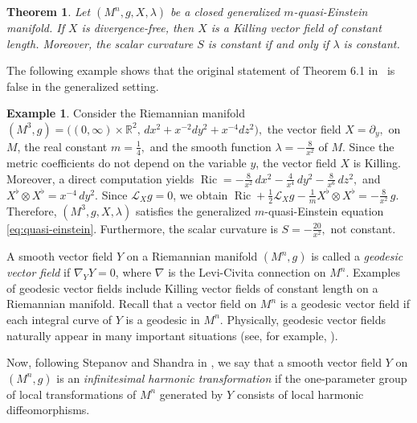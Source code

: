 \documentclass[a4paper, 12pt]{amsart}
\DeclareMathOperator{\Ric}{Ric}
\newtheorem{theo}{Theorem}
\theoremstyle{definition}
\newtheorem{example}{Example}
\numberwithin{figure}{section}
\begin{document}
\begin{theo}\label{teo6.1}
Let $(M^n,g,X,\lambda)$ be a closed generalized $m$-quasi-Einstein manifold. If $X$ is divergence-free, then $X$ is a Killing vector field of constant length. Moreover, the scalar curvature $S$ is constant if and only if $\lambda$ is constant.%
\end{theo}

The following example shows that the original statement of Theorem 6.1 in~\cite{ghosh} is false in the generalized setting.
\begin{example}
Consider the Riemannian manifold
$
(M^3,g)=\bigl((0,\infty)\times\mathbb{R}^2,\,dx^2+x^{-2}dy^2+x^{-4}dz^2\bigr),
$
the vector field
$
X=\partial_y,
$ on \(M\),
the real constant
$
m=\frac14,
$
and the smooth function
$
\lambda=-\frac{8}{x^2}$ of \(M\).
Since the metric coefficients do not depend on the variable \(y\), the vector field \(X\) is Killing. Moreover, a direct computation yields
$\Ric=-\frac{8}{x^2}\,dx^2-\frac{4}{x^4}\,dy^2-\frac{8}{x^6}\,dz^2,
$ and
$X^\flat\otimes X^\flat=x^{-4}\,dy^2.
$
Since \(\mathcal{L}_Xg=0\), we obtain
$
\Ric+\frac12\mathcal{L}_Xg-\frac1mX^\flat\otimes X^\flat
=-\frac{8}{x^2}\,g.
$
Therefore, \((M^3,g,X,\lambda)\) satisfies the generalized \(m\)-quasi-Einstein equation \eqref{eq:quasi-einstein}.
Furthermore, the scalar curvature is
$
S=-\frac{20}{x^2},
$ not constant.

\end{example}

A smooth vector field $Y$ on a Riemannian manifold $(M^n,g)$ is called a \textit{geodesic vector field} if $\nabla_YY=0$, where $\nabla$ is the Levi-Civita connection on $M^n$. Examples of geodesic vector fields include Killing vector fields of constant length on a Riemannian manifold. Recall that a vector field on $M^n$ is a geodesic vector field if each integral curve of $Y$ is a geodesic in $M^n.$ Physically, geodesic vector fields naturally appear in many important situations (see, for example, \cite{deshmukh2019geodesic,yano1961geodesic}).

Now, following Stepanov and Shandra in \cite{StepanovShandra2003}, we say that a smooth vector field $Y$ on $(M^n,g)$ is an \textit{infinitesimal harmonic transformation} if the one-parameter group of local transformations of $M^n$ generated by $Y$ consists of local harmonic diffeomorphisms.
\end{document}
